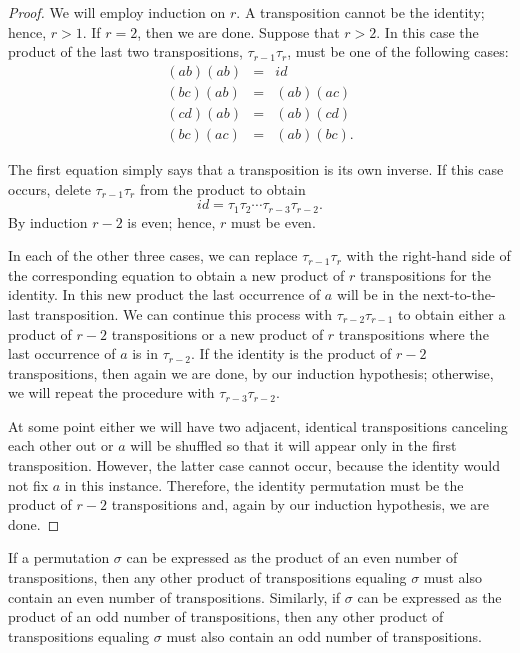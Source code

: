  
\begin{proof}
We will employ  induction  on $r$.  A transposition cannot be the
identity; hence,   $r > 1$. If $r=2$, then we are done. Suppose that
$r > 2$. In this case the product of the last two transpositions,
$\tau_{r-1} \tau_r$, must be one of the following cases: 
\begin{eqnarray*}
(a b)(a b) & = & id \\
(b c)(a b) & = & (a b)(a c) \\
(c d)(a b) & = & (a b)(c d) \\
(b c)(a c) & = & (a b)(b c).
\end{eqnarray*}
 
 
The first equation simply says that a transposition is its own
inverse. If this case occurs, delete $\tau_{r-1} \tau_r$ from the 
product to obtain 
$$
id = \tau_1 \tau_2 \cdots \tau_{r-3} \tau_{r-2}.
$$
By induction $r-2$ is even; hence, $r$ must be even.
 
 
In each of the other three cases, we can replace $\tau_{r-1} \tau_r$ 
with the right-hand side of the corresponding equation to obtain a new
product of $r$ transpositions for the identity. In this new product
the last occurrence of $a$ will be in the next-to-the-last
transposition. We can continue this process with $\tau_{r-2}
\tau_{r-1}$ to obtain either a product of $r-2$ transpositions or a
new product of $r$ transpositions where the last occurrence of $a$ is
in $\tau_{r-2}$. If the identity is the product of $r-2$
transpositions, then again we are done, by our induction hypothesis;
otherwise, we will repeat the procedure with $\tau_{r-3} \tau_{r-2}$.
 
 
At some point either we will have two adjacent, identical
transpositions canceling each other out or $a$ will be shuffled 
so that it will appear only in the first transposition. However, the
latter case cannot occur, because the identity would not fix $a$ in
this instance. Therefore, the identity permutation must be the product
of $r-2$ transpositions and, again by our induction hypothesis, we are
done. 
\end{proof}
 
 
\begin{theorem}
If a permutation $\sigma$ can be expressed as the product of an even
number of transpositions, then any other product of transpositions
equaling $\sigma$ must also contain an even number of transpositions.
Similarly, if $\sigma$ can be expressed as the product of an odd
number of transpositions, then any other product of transpositions
equaling $\sigma$ must also contain an odd number of transpositions. 
\end{theorem}
 
